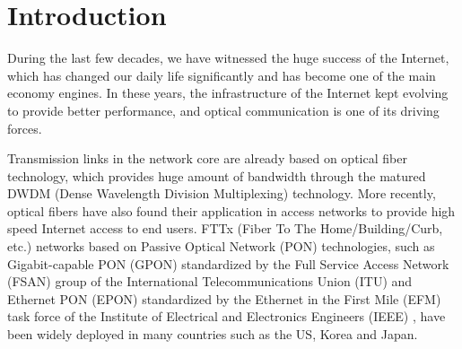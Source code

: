 \section{Introduction} \label{section_introduction}

During the last few decades, we have witnessed the huge success of
the Internet, which has changed our daily life significantly and
has become one of the main economy engines. In these years, the
infrastructure of the Internet kept evolving to provide better
performance, and optical communication is one of its driving
forces.

Transmission links in the network core are already based on
optical fiber technology, which provides huge amount of bandwidth
through the matured DWDM (Dense Wavelength Division Multiplexing)
technology.
More recently, optical fibers have also found their application in
access networks to provide high speed Internet access to end
users.
FTTx (Fiber To The Home/Building/Curb, etc.) networks based on
Passive Optical Network (PON) technologies, such as
Gigabit-capable PON (GPON) standardized by the Full Service Access
Network (FSAN) group of the International Telecommunications Union
(ITU) \cite{itu08gpon} and Ethernet PON (EPON) standardized by the
Ethernet in the First Mile (EFM) task force of the Institute of
Electrical and Electronics Engineers (IEEE)
\cite{ieee04EPON8023ah}, have been widely deployed in many
countries such as the US, Korea and Japan.



